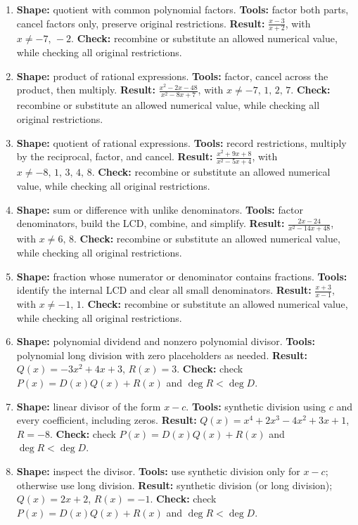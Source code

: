 \documentclass[11pt,oneside]{book}
\begin{document}
\begin{enumerate}[leftmargin=*,label=\textbf{CAP\arabic*.},itemsep=0.45\baselineskip]
\item \textbf{Shape:} quotient with common polynomial factors. \textbf{Tools:} factor both parts, cancel factors only, preserve original restrictions. \textbf{Result:} $\displaystyle \frac{x - 3}{x + 2}$, with $x\ne -7,\,-2$. \textbf{Check:} recombine or substitute an allowed numerical value, while checking all original restrictions.
\item \textbf{Shape:} product of rational expressions. \textbf{Tools:} factor, cancel across the product, then multiply. \textbf{Result:} $\displaystyle \frac{x^{2} - 2 x - 48}{x^{2} - 8 x + 7}$, with $x\ne -7,\,1,\,2,\,7$. \textbf{Check:} recombine or substitute an allowed numerical value, while checking all original restrictions.
\item \textbf{Shape:} quotient of rational expressions. \textbf{Tools:} record restrictions, multiply by the reciprocal, factor, and cancel. \textbf{Result:} $\displaystyle \frac{x^{2} + 9 x + 8}{x^{2} - 5 x + 4}$, with $x\ne -8,\,1,\,3,\,4,\,8$. \textbf{Check:} recombine or substitute an allowed numerical value, while checking all original restrictions.
\item \textbf{Shape:} sum or difference with unlike denominators. \textbf{Tools:} factor denominators, build the LCD, combine, and simplify. \textbf{Result:} $\displaystyle \frac{2 x - 24}{x^{2} - 14 x + 48}$, with $x\ne 6,\,8$. \textbf{Check:} recombine or substitute an allowed numerical value, while checking all original restrictions.
\item \textbf{Shape:} fraction whose numerator or denominator contains fractions. \textbf{Tools:} identify the internal LCD and clear all small denominators. \textbf{Result:} $\displaystyle \frac{x + 3}{x - 1}$, with $x\ne -1,\,1$. \textbf{Check:} recombine or substitute an allowed numerical value, while checking all original restrictions.
\item \textbf{Shape:} polynomial dividend and nonzero polynomial divisor. \textbf{Tools:} polynomial long division with zero placeholders as needed. \textbf{Result:} $Q(x)=- 3 x^{2} + 4 x + 3$, $R(x)=3$. \textbf{Check:} check $P(x)=D(x)Q(x)+R(x)$ and $\deg R<\deg D$.
\item \textbf{Shape:} linear divisor of the form $x-c$. \textbf{Tools:} synthetic division using $c$ and every coefficient, including zeros. \textbf{Result:} $Q(x)=x^{4} + 2 x^{3} - 4 x^{2} + 3 x + 1$, $R=-8$. \textbf{Check:} check $P(x)=D(x)Q(x)+R(x)$ and $\deg R<\deg D$.
\item \textbf{Shape:} inspect the divisor. \textbf{Tools:} use synthetic division only for $x-c$; otherwise use long division. \textbf{Result:} synthetic division (or long division); $Q(x)=2 x + 2$, $R(x)=-1$. \textbf{Check:} check $P(x)=D(x)Q(x)+R(x)$ and $\deg R<\deg D$.

\end{enumerate}
\end{document}
